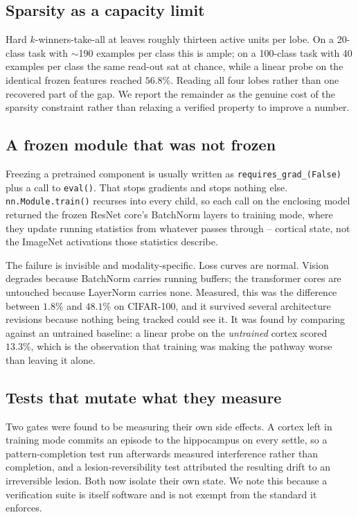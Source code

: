 \documentclass[conference]{IEEEtran}
\begin{document}
\subsection{Sparsity as a capacity limit}

Hard $k$-winners-take-all at \ArchitectureSparsity{} leaves roughly thirteen
active units per lobe. On a 20-class task with $\sim$190 examples per class this
is ample; on a 100-class task with 40 examples per class the same read-out sat
at chance, while a linear probe on the identical frozen features reached
$56.8\%$. Reading all four lobes rather than one recovered part of the gap. We
report the remainder as the genuine cost of the sparsity constraint rather than
relaxing a verified property to improve a number.

\subsection{A frozen module that was not frozen}

Freezing a pretrained component is usually written as
\texttt{requires\_grad\_(False)} plus a call to \texttt{eval()}. That stops
gradients and stops nothing else. \texttt{nn.Module.train()} recurses into
every child, so each call on the enclosing model returned the frozen ResNet
core's BatchNorm layers to training mode, where they update running statistics
from whatever passes through -- cortical state, not the ImageNet activations
those statistics describe.

The failure is invisible and modality-specific. Loss curves are normal.
Vision degrades because BatchNorm carries running buffers; the transformer
cores are untouched because LayerNorm carries none. Measured, this was the
difference between $1.8\%$ and $48.1\%$ on CIFAR-100, and it survived several
architecture revisions because nothing being tracked could see it. It was
found by comparing against an untrained baseline: a linear probe on the
\emph{untrained} cortex scored $13.3\%$, which is the observation that
training was making the pathway worse than leaving it alone.

\subsection{Tests that mutate what they measure}

Two gates were found to be measuring their own side effects. A cortex left in
training mode commits an episode to the hippocampus on every settle, so a
pattern-completion test run afterwards measured interference rather than
completion, and a lesion-reversibility test attributed the resulting drift to an
irreversible lesion. Both now isolate their own state. We note this because a
verification suite is itself software and is not exempt from the standard it
enforces.
\end{document}
